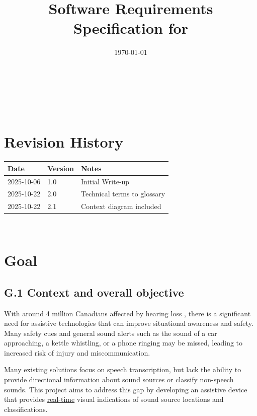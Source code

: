 \documentclass[12pt]{article}
\theoremstyle{definition}
\begin{document}
\title{Software Requirements Specification for \progname} 
\author{\authname}
\date{\today}
	
\maketitle

~\newpage


\tableofcontents

~\newpage

\section*{Revision History}


\begin{tabularx}{\textwidth}{p{3cm}p{2cm}X} \toprule {\bf Date} & {\bf Version}
& {\bf Notes}\\
\midrule
2025-10-06 & 1.0 & Initial Write-up\\
2025-10-22 & 2.0 & Technical terms to glossary\\
2025-10-22 & 2.1 & Context diagram included\\
\bottomrule
\end{tabularx}


~\newpage


\section{Goal}

\subsection{G.1 Context and overall objective}

With around 4 million Canadians affected by hearing loss \cite{Healthing2025},
there is a significant need for assistive technologies that can improve
situational awareness and safety. Many safety cues and general sound alerts such
as the sound of a car approaching, a kettle whistling, or a phone ringing may be
missed, leading to increased risk of injury and miscommunication.

Many existing solutions focus on speech transcription, but lack the ability to
provide directional information about sound sources or classify non-speech
sounds. This project aims to address this gap by developing an assistive device
that provides \hyperref[def:real_time]{real-time} visual indications of sound
source locations and classifications.
\end{document}
